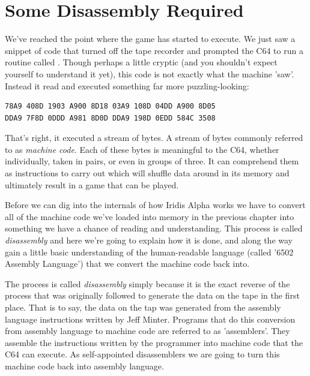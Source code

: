 \chapter{Some Disassembly Required} 
\label{sec:disassembly}
\lstset{style=6502Style}

We've reached the point where the game has started to execute. We just saw a
snippet of code that turned off the tape recorder and prompted the C64 to run a
routine called .
Though perhaps a little cryptic (and you shouldn't expect yourself to understand it yet),
this code is not exactly what the machine 'saw'. Instead it read and executed
something far more puzzling-looking:


\begin{lstlisting}[caption=The first piece of machine code that is executed in Iridis Alpha.,escapechar=\%]
78A9 408D 1903 A900 8D18 03A9 108D 04DD A900 8D05
DDA9 7F8D 0DDD A981 8D0D DDA9 198D 0EDD 584C 3508 
\end{lstlisting}

That's right, it executed a stream of bytes. A stream of bytes commonly referred to as \textit{machine code}. Each of these
bytes is meaningful to the C64, whether individually, taken in pairs, or even in groups of three. It can comprehend them
as instructions to carry out which will shuffle data around in its memory and ultimately result in a game that
can be played.

Before we can dig into the internals of how Iridis Alpha works we have to convert all of the machine code we've
loaded into memory in the previous chapter into something we have a chance of reading and understanding. This
process is called \textit{disassembly} and here we're going to explain how it is done, and along the way gain a little
basic understanding of the human-readable language (called '6502 Assembly Language') that we convert the machine
code back into.

The process is called \textit{disassembly} simply because it is the exact
reverse of the process that was originally followed to generate the data on the
tape in the first place. That is to say, the data on the tap was generated from the assembly language instructions written by
Jeff Minter. Programs that do this conversion from assembly language to machine code are referred to as
'assemblers'. They assemble the instructions written by the programmer into
machine code that the C64 can execute. As self-appointed disassemblers we are
going to turn this machine code back into assembly language.

